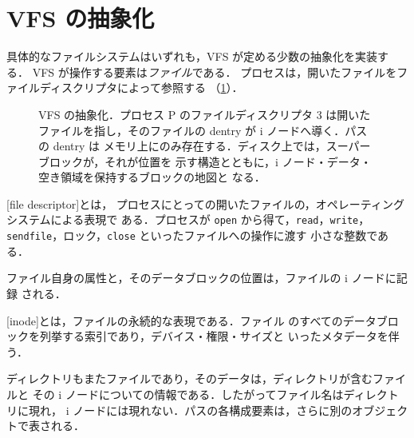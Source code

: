 \documentclass[../main.tex]{subfiles}
\begin{document}
\section{VFS の抽象化}
\label{sec:l11-vfs-abs}

具体的なファイルシステムはいずれも，VFS が定める少数の抽象化を実装する．
VFS が操作する要素は\emph{ファイル}である．
プロセスは，開いたファイルをファイルディスクリプタによって参照する
（\cref{fig:l11-vfs-objects}）．

\begin{figure}[tb]
  \centering
  
  \caption{VFS の抽象化．プロセス P のファイルディスクリプタ 3 は開いた
    ファイルを指し，そのファイルの dentry が i ノードへ導く．パスの dentry は
    メモリ上にのみ存在する．ディスク上では，スーパーブロックが，それが位置を
    示す構造とともに，i ノード・データ・空き領域を保持するブロックの地図と
    なる．}
  \label{fig:l11-vfs-objects}
\end{figure}

\begin{definition}[ファイルディスクリプタ]
  [file descriptor]とは，
  プロセスにとっての開いたファイルの，オペレーティングシステムによる表現で
  ある．プロセスが \texttt{open} から得て，\texttt{read}，\texttt{write}，
  \texttt{sendfile}，ロック，\texttt{close} といったファイルへの操作に渡す
  小さな整数である．
\end{definition}

ファイル自身の属性と，そのデータブロックの位置は，ファイルの i ノードに記録
される．

\begin{definition}[i ノード]
  [inode]とは，ファイルの永続的な表現である．ファイル
  のすべてのデータブロックを列挙する索引であり，デバイス・権限・サイズと
  いったメタデータを伴う．%
\end{definition}

ディレクトリもまたファイルであり，そのデータは，ディレクトリが含むファイルと
その i ノードについての情報である．したがってファイル名はディレクトリに現れ，
i ノードには現れない．パスの各構成要素は，さらに別のオブジェクトで表される．
\end{document}

